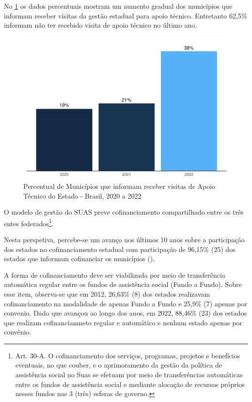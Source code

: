 \documentclass[
  brazilian]{report}
\begin{document}
No \cref{fig:munic_vit_estadual} os dados percentuais mostram um aumento
gradual dos municípios que informam receber visitas da gestão estadual
para apoio técnico. Entretanto 62,5\% informam não ter recebido visita
de apoio técnico no último ano.

\begin{figure}
\includegraphics{Censo-SUAS-2022_files/figure-latex/munic_vit_estadual-1} \caption[Percentual de Municípios que informam receber visitas de Apoio Técnico do Estado - Brasil, 2020 a 2022]{Percentual de Municípios que informam receber visitas de Apoio Técnico do Estado - Brasil, 2020 a 2022}\label{fig:munic_vit_estadual}
\end{figure}

O modelo de gestão do SUAS preve cofinanciamento compartilhado entre os
três entes
federados\footnote{Art. 30-A.  O cofinanciamento dos serviços, programas, projetos e benefícios eventuais, no que couber, e o aprimoramento da gestão da política de assistência social no Suas se efetuam por meio de transferências automáticas entre os fundos de assistência social e mediante alocação de recursos próprios nesses fundos nas 3 (três) esferas de governo.}.

Nesta perspetiva, percebe-se um avanço nos últimos 10 anos sobre a
participação dos estados no cofinanciamento estadual com participação de
96,15\% (25) dos estados que informam cofinanciar os municípios
().

A forma de cofinanciamento deve ser viabilizada por meio de
transferência automática regular entre os fundos de assistência social
(Fundo a Fundo). Sobre esse item, observa-se que em 2012, 26,63\% (8)
dos estados realizavam cofinanciamento na modalidade de apenas Fundo a
Fundo e 25,9\% (7) apenas por convenio. Dado que avançou ao longo dos
anos, em 2022, 88,46\% (23) dos estados que realizam cofinanciamneto
regular e automático e nenhum estado apenas por convênio.
\end{document}
